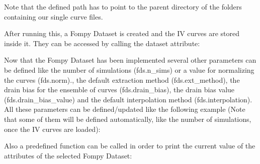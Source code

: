 \documentclass[letterpaper,10pt,english,openany, oneside]{sphinxmanual}
\begin{document}
%
\begin{sphinxVerbatim}[commandchars=\\\{\}]
  
   
\end{sphinxVerbatim}

Note that the defined path has to point to the parent directory of the folders containing our single curve files.

After running this, a Fompy Dataset is created and the IV curves are stored inside it.
They can be accessed by calling the dataset attribute:

%
\begin{sphinxVerbatim}[commandchars=\\\{\}]
\end{sphinxVerbatim}

Now that the Fompy Dataset has been implemented several other parameters can be defined like the
number of simulations (fds.n\_sims) or a value for normalizing the curves (fds.norm)., the default extraction
method (fds.ext\_method), the drain bias for the ensemble of curves (fds.drain\_bias), the drain bias value
(fds.drain\_bias\_value) and the default interpolation method (fds.interpolation). All these parameters can be defined/updated
like the following example (Note that some of them will be defined automatically, like the number of simulations,
once the IV curves are loaded):

%
\begin{sphinxVerbatim}[commandchars=\\\{\}]
  
\end{sphinxVerbatim}

Also a predefined function can be called in order to print the current value of the attributes of the selected Fompy Dataset:

%
\begin{sphinxVerbatim}[commandchars=\\\{\}]
\end{sphinxVerbatim}
\end{document}
